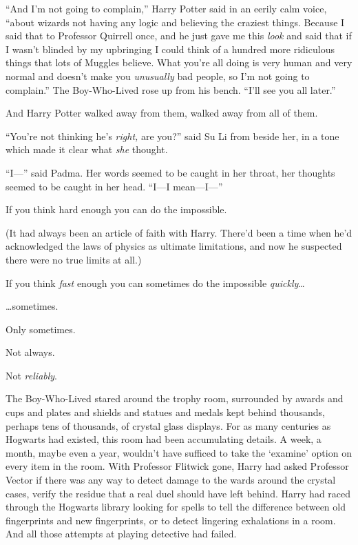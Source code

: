“And I’m not going to complain,” Harry Potter said in an eerily calm voice, “about wizards not having any logic and believing the craziest things. Because I said that to Professor Quirrell once, and he just gave me this \emph{look} and said that if I wasn’t blinded by my upbringing I could think of a hundred more ridiculous things that lots of Muggles believe. What you’re all doing is very human and very normal and doesn’t make you \emph{unusually} bad people, so I’m not going to complain.” The Boy-Who-Lived rose up from his bench. “I’ll see you all later.”

And Harry Potter walked away from them, walked away from all of them.

“You’re not thinking he’s \emph{right,} are you?” said Su Li from beside her, in a tone which made it clear what \emph{she} thought.

“I—” said Padma. Her words seemed to be caught in her throat, her thoughts seemed to be caught in her head. “I—I mean—I—”

\later

If you think hard enough you can do the impossible.

(It had always been an article of faith with Harry. There’d been a time when he’d acknowledged the laws of physics as ultimate limitations, and now he suspected there were no true limits at all.)

If you think \emph{fast} enough you can sometimes do the impossible \emph{quickly}…

…sometimes.

Only sometimes.

Not always.

Not \emph{reliably}.

The Boy-Who-Lived stared around the trophy room, surrounded by awards and cups and plates and shields and statues and medals kept behind thousands, perhaps tens of thousands, of crystal glass displays. For as many centuries as Hogwarts had existed, this room had been accumulating details. A week, a month, maybe even a year, wouldn’t have sufficed to take the ‘examine’ option on every item in the room. With Professor Flitwick gone, Harry had asked Professor Vector if there was any way to detect damage to the wards around the crystal cases, verify the residue that a real duel should have left behind. Harry had raced through the Hogwarts library looking for spells to tell the difference between old fingerprints and new fingerprints, or to detect lingering exhalations in a room. And all those attempts at playing detective had failed.

